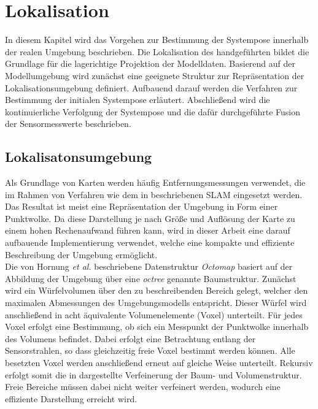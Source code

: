 \chapter{Lokalisation}
\label{chap.loc}
\prever{
}

In diesem Kapitel wird das Vorgehen zur Bestimmung der Systempose innerhalb der realen Umgebung beschrieben. Die Lokalisation des handgeführten  bildet die Grundlage für die lagerichtige Projektion der Modelldaten. Basierend auf der Modellumgebung wird zunächst eine geeignete Struktur zur Repräsentation der Lokalisationsumgebung definiert. Aufbauend darauf werden die Verfahren zur Bestimmung der initialen Systempose erläutert. Abschließend wird die kontinuierliche Verfolgung der Systempose und die dafür durchgeführte Fusion der Sensormesswerte beschrieben.

\section{Lokalisatonsumgebung}
\label{chap.map}
Als Grundlage von Karten werden häufig Entfernungsmessungen verwendet, die im Rahmen von Verfahren wie dem in  beschriebenen SLAM eingesetzt werden. Das Resultat ist meist eine Repräsentation der Umgebung in Form einer Punktwolke. Da diese Darstellung je nach Größe und Auflösung der Karte zu einem hohen Rechenaufwand führen kann, wird in dieser Arbeit eine darauf aufbauende Implementierung \cite{Octomap} verwendet, welche eine kompakte und effiziente Beschreibung der Umgebung ermöglicht.\\

Die von Hornung \textit{et al.} \cite{Hornung2013} beschriebene Datenstruktur \textit{Octomap} basiert auf der Abbildung der Umgebung über eine \textit{octree} genannte Baumstruktur. Zunächst wird ein Würfelvolumen über den zu beschreibenden Bereich gelegt, welcher den maximalen Abmessungen des Umgebungsmodells entspricht. Dieser Würfel wird anschließend in acht äquivalente Volumenelemente (Voxel) unterteilt. Für jedes Voxel erfolgt eine Bestimmung, ob sich ein Messpunkt der Punktwolke innerhalb des Volumens befindet. Dabei erfolgt eine Betrachtung entlang der Sensorstrahlen, so dass gleichzeitig freie Voxel bestimmt werden können. Alle besetzten Voxel werden anschließend erneut auf gleiche Weise unterteilt. Rekursiv erfolgt somit die in  dargestellte Verfeinerung der Baum- und Volumenstruktur. Freie Bereiche müssen dabei nicht weiter verfeinert werden, wodurch eine effiziente Darstellung erreicht wird.\\

